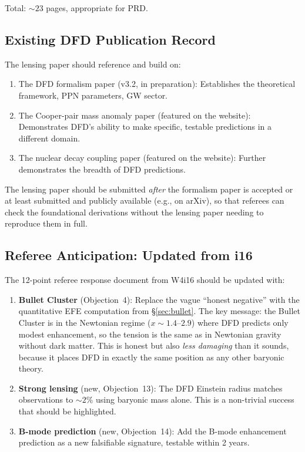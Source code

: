 \documentclass[11pt,a4paper]{article}
\begin{document}
Total: $\sim 23$ pages, appropriate for PRD.

\subsection{Existing DFD Publication Record}

The lensing paper should reference and build on:
\begin{enumerate}
\item The DFD formalism paper (v3.2, in preparation): Establishes the
  theoretical framework, PPN parameters, GW sector.
\item The Cooper-pair mass anomaly paper (featured on the website):
  Demonstrates DFD's ability to make specific, testable predictions
  in a different domain.
\item The nuclear decay coupling paper (featured on the website):
  Further demonstrates the breadth of DFD predictions.
\end{enumerate}

The lensing paper should be submitted \emph{after} the formalism paper
is accepted or at least submitted and publicly available (e.g., on
arXiv), so that referees can check the foundational derivations without
the lensing paper needing to reproduce them in full.

\subsection{Referee Anticipation: Updated from i16}

The 12-point referee response document from W4i16 should be updated with:
\begin{enumerate}
\item \textbf{Bullet Cluster} (Objection~4): Replace the vague ``honest
  negative'' with the quantitative EFE computation from
  \S\ref{sec:bullet}.  The key message: the Bullet Cluster is in the
  Newtonian regime ($x \sim 1.4$--$2.9$) where DFD predicts only modest
  enhancement, so the tension is the same as in Newtonian gravity
  without dark matter.  This is honest but also \emph{less damaging}
  than it sounds, because it places DFD in exactly the same position
  as any other baryonic theory.
\item \textbf{Strong lensing} (new, Objection~13): The DFD Einstein
  radius matches observations to $\sim 2\%$ using baryonic mass alone.
  This is a non-trivial success that should be highlighted.
\item \textbf{B-mode prediction} (new, Objection~14): Add the B-mode
  enhancement prediction as a new falsifiable signature, testable
  within 2 years.
\end{enumerate}
\end{document}
